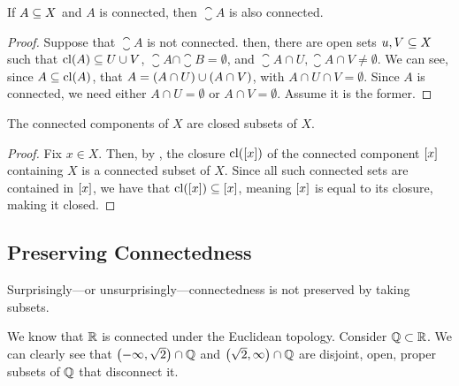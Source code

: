 \begin{boxlemma}\label{Ch1:Lemma:closure_connected_connected}
    If $A \subseteq X$ and $A$ is connected, then $\closure{A}$ is also connected.
\end{boxlemma}
\begin{proof} %
    Suppose that $\closure{A}$ is not connected. then, there are open sets $u, V \subseteq X$ such that $\operatorname{cl}\!\left( A \right) \subseteq U \cup V$, $\closure{A} \cap \closure{B} = \emptyset$, and $\closure{A} \cap U, \closure{A} \cap V \neq \emptyset$.  We can see, since $A \subseteq \operatorname{cl}\!\left( A \right)$, that $A = \left( A \cap U \right) \cup \left( A \cap V \right)$, with $A \cap U \cap V = \emptyset$. Since $A$ is connected, we need either $A \cap U = \emptyset$ or $A \cap V = \emptyset$. Assume it is the former. \sorry %
\end{proof}

\begin{boxcorollary}
    The connected components of $X$ are closed subsets of $X$.
\end{boxcorollary}
\begin{proof}
    Fix $x \in X$. Then, by , the closure $\operatorname{cl}\!\left( \left[ x \right] \right)$ of the connected component $\left[ x \right]$ containing $X$ is a connected subset of $X$. Since all such connected sets are contained in $\left[ x \right]$, we have that $\operatorname{cl}\!\left( \left[ x \right] \right) \subseteq \left[ x \right]$, meaning $\left[ x \right]$ is equal to its closure, making it closed.
\end{proof}

\subsection{Preserving Connectedness}

Surprisingly---or unsurprisingly---connectedness is not preserved by taking subsets.

\begin{boxcexample}
    We know that $\mathbb{R}$ is connected under the Euclidean topology. Consider $\mathbb{Q} \subset \mathbb{R}$. We can clearly see that $\left( -\infty, \sqrt{2} \right) \cap \mathbb{Q}$ and $\left( \sqrt{2}, \infty \right) \cap \mathbb{Q}$ are disjoint, open, proper subsets of $\mathbb{Q}$ that disconnect it.
\end{boxcexample}

